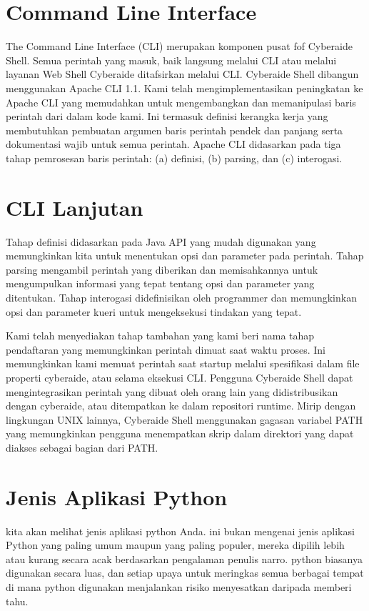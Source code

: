 \documentclass[12pt, times new roman, a4paper]{article}
\begin{document}
\section{Command Line Interface}
The Command Line Interface (CLI) merupakan komponen pusat fof Cyberaide Shell. Semua perintah yang masuk, baik langsung melalui CLI atau melalui layanan Web Shell Cyberaide ditafsirkan melalui CLI. Cyberaide Shell dibangun menggunakan Apache CLI 1.1. Kami telah mengimplementasikan peningkatan ke Apache CLI yang memudahkan untuk mengembangkan dan memanipulasi baris perintah dari dalam kode kami. Ini termasuk definisi kerangka kerja yang membutuhkan pembuatan argumen baris perintah pendek dan panjang serta dokumentasi wajib untuk semua perintah. Apache CLI didasarkan pada tiga tahap pemrosesan baris perintah: (a) definisi, (b) parsing, dan (c) interogasi.

\section{CLI Lanjutan}
Tahap definisi didasarkan pada Java API yang mudah digunakan yang memungkinkan kita untuk menentukan opsi dan parameter pada perintah. Tahap parsing mengambil perintah yang diberikan dan memisahkannya untuk mengumpulkan informasi yang tepat tentang opsi dan parameter yang ditentukan. Tahap interogasi didefinisikan oleh programmer dan memungkinkan opsi dan parameter kueri untuk mengeksekusi tindakan yang tepat.

Kami telah menyediakan tahap tambahan yang kami beri nama tahap pendaftaran yang memungkinkan perintah dimuat saat waktu proses. Ini memungkinkan kami memuat perintah saat startup melalui spesifikasi dalam file properti cyberaide, atau selama eksekusi CLI. Pengguna Cyberaide Shell dapat mengintegrasikan perintah yang dibuat oleh orang lain yang didistribusikan dengan cyberaide, atau ditempatkan ke dalam repositori runtime. Mirip dengan lingkungan UNIX lainnya, Cyberaide Shell menggunakan gagasan variabel PATH yang memungkinkan pengguna menempatkan skrip dalam direktori yang dapat diakses sebagai bagian dari PATH.

\section{Jenis Aplikasi Python}
kita akan melihat jenis aplikasi python Anda. ini bukan mengenai jenis aplikasi Python yang paling umum maupun yang paling populer, mereka dipilih lebih atau kurang secara acak berdasarkan pengalaman penulis narro. python biasanya digunakan secara luas, dan setiap upaya untuk meringkas semua berbagai tempat di mana python digunakan menjalankan risiko menyesatkan daripada memberi tahu.
\end{document}
